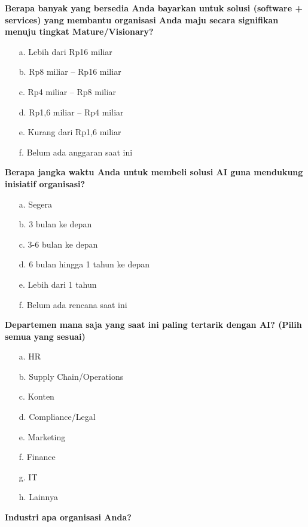 \documentclass{article}
\begin{document}
\textbf{Berapa banyak yang bersedia Anda bayarkan untuk solusi (software + services) yang membantu organisasi Anda maju secara signifikan menuju tingkat Mature/Visionary?}

\begin{enumerate}
	\item[a.] Lebih dari Rp16 miliar
	\item[b.] Rp8 miliar – Rp16 miliar
	\item[c.] Rp4 miliar – Rp8 miliar
	\item[d.] Rp1,6 miliar – Rp4 miliar
	\item[e.] Kurang dari Rp1,6 miliar
	\item[f.] Belum ada anggaran saat ini
\end{enumerate}

\textbf{Berapa jangka waktu Anda untuk membeli solusi AI guna mendukung inisiatif organisasi?}

\begin{enumerate}
	\item[a.] Segera
	\item[b.] 3 bulan ke depan
	\item[c.] 3-6 bulan ke depan
	\item[d.] 6 bulan hingga 1 tahun ke depan
	\item[e.] Lebih dari 1 tahun
	\item[f.] Belum ada rencana saat ini
\end{enumerate}

\textbf{Departemen mana saja yang saat ini paling tertarik dengan AI? (Pilih semua yang sesuai)}

\begin{enumerate}
	\item[a.] HR
	\item[b.] Supply Chain/Operations
	\item[c.] Konten
	\item[d.] Compliance/Legal
	\item[e.] Marketing
	\item[f.] Finance
	\item[g.] IT
	\item[h.] Lainnya
\end{enumerate}

\textbf{Industri apa organisasi Anda?}
\end{document}
